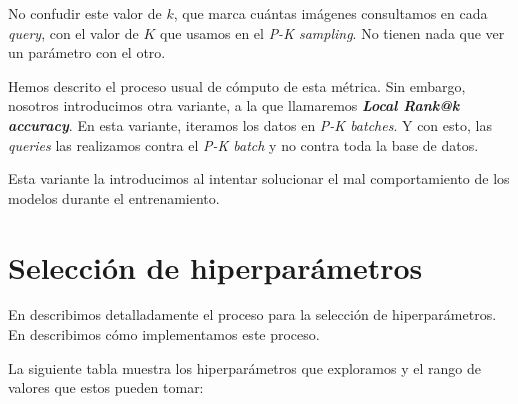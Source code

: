 No confudir este valor de $k$, que marca cuántas imágenes consultamos en cada \textit{query}, con el valor de $K$ que usamos en el \textit{P-K sampling}. No tienen nada que ver un parámetro con el otro.


Hemos descrito el proceso usual de cómputo de esta métrica. Sin embargo, nosotros introducimos otra variante, a la que llamaremos \textbf{\textit{Local Rank@k accuracy}}. En esta variante, iteramos los datos en \textit{P-K batches}. Y con esto, las \textit{queries} las realizamos contra el \textit{P-K batch} y no contra toda la base de datos.

Esta variante la introducimos al intentar solucionar el mal comportamiento de los modelos durante el entrenamiento.


\section{Selección de hiperparámetros} \label{isec:experimentacion_hp_tuning}

En  describimos detalladamente el proceso para la selección de hiperparámetros. En  describimos cómo implementamos este proceso.

La siguiente tabla muestra los hiperparámetros que exploramos y el rango de valores que estos pueden tomar:

